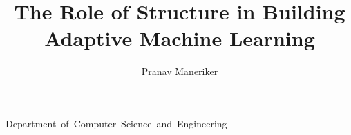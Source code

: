 \documentclass[osudraft]{osudissert96}
\begin{document}
%
%

\author{Pranav Maneriker}
\title{The Role of Structure in Building Adaptive Machine Learning}
\unit{Department of Computer Science and Engineering}




\maketitle



%
%


\begin{normalsize}


\disscopyright


\begin{abstract}
    
\end{abstract}

\dedication{Dedicated to Meghana, Pranjali, my parents, teachers, and Sage.}

\begin{acknowledgments}
    
\end{acknowledgments}

\begin{vita}
    
\end{vita}

\tableofcontents
\pagebreak
\listoftables
\pagebreak
\listoffigures
\pagebreak
\end{normalsize}




\begin{normalsize}










%

\end{normalsize}


\begin{footnotesize}
\begin{spacing}{0.6}




\end{spacing}
\end{footnotesize}
\end{document}
